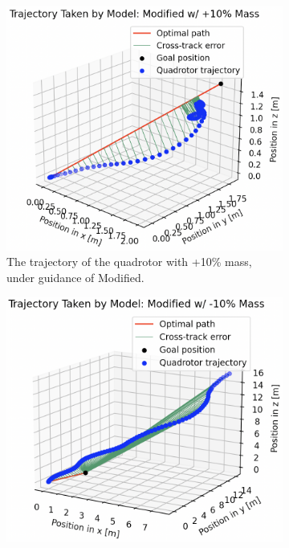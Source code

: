 \begin{figure}[H]
     \centering
     \begin{subfigure}[b]{0.51\textwidth}
         \centering
         \captionsetup{justification=centering}
         \includegraphics[width=\textwidth]{figures/5_/Testing/ddpg_test_robust+10-1.png}
         \caption{The trajectory of the quadrotor with +10\% mass, under guidance of Modified.}
         \label{fig:ddpg_test_robust+10-1}
     \end{subfigure} 
     \hfill 
     \begin{subfigure}[b]{0.48\textwidth}
         \centering
         \captionsetup{justification=centering}
         \includegraphics[width=\textwidth]{figures/5_/Testing/ddpg_test_robust-10-1.png}

\end{subfigure}
\end{figure}
